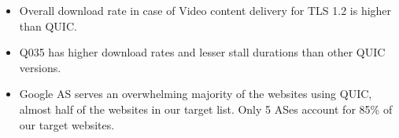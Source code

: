\begin{frame}
\begin{itemize}
\item Overall download rate in case of Video content delivery for TLS 1.2 is higher than QUIC.


\item Q035 has higher download rates and lesser stall durations than other QUIC versions.

\item Google AS serves an overwhelming majority of the websites using QUIC, almost half of the websites in our target list. Only 5 ASes account for 85\% of our target websites.




\end{itemize}
\end{frame}
\clearpage

